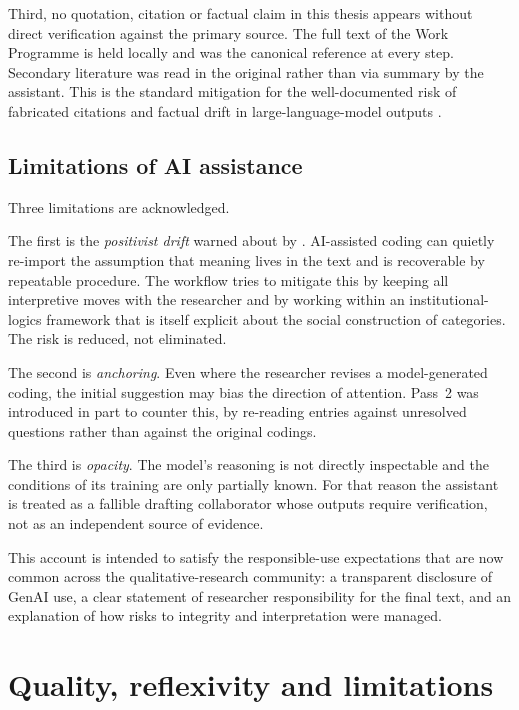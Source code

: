 Third, no quotation, citation or factual claim in this thesis appears
without direct verification against the primary source. The full text
of the Work Programme is held locally and was the canonical reference
at every step. Secondary literature was read in the original rather
than via summary by the assistant. This is the standard mitigation for
the well-documented risk of fabricated citations and factual drift in
large-language-model outputs \parencite{nguyen2025engaged}.

\subsection{Limitations of AI assistance}
\label{sec:meth-genai-limits}

Three limitations are acknowledged.

The first is the \emph{positivist drift} warned about by
\textcite{chatzichristos2025qualitative}. AI-assisted coding can
quietly re-import the assumption that meaning lives in the text and
is recoverable by repeatable procedure. The workflow tries to
mitigate this by keeping all interpretive moves with the researcher
and by working within an institutional-logics framework that is itself
explicit about the social construction of categories. The risk is
reduced, not eliminated.

The second is \emph{anchoring}. Even where the researcher revises a
model-generated coding, the initial suggestion may bias the direction
of attention. Pass~2 was introduced in part to counter this, by
re-reading entries against unresolved questions rather than against
the original codings.

The third is \emph{opacity}. The model's reasoning is not directly
inspectable and the conditions of its training are only partially
known. For that reason the assistant is treated as a fallible
drafting collaborator whose outputs require verification, not as an
independent source of evidence.

This account is intended to satisfy the responsible-use expectations
that are now common across the qualitative-research community: a
transparent disclosure of GenAI use, a clear statement of researcher
responsibility for the final text, and an explanation of how risks
to integrity and interpretation were managed.

\section{Quality, reflexivity and limitations}
\label{sec:meth-quality}

